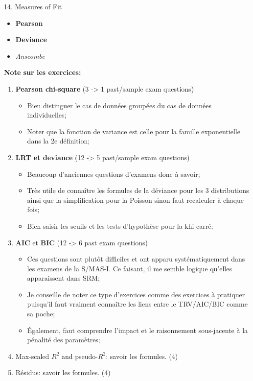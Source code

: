 \documentclass[12pt, titlepage, french]{report}
\begin{document}
\begin{CHPT_SUMM}[label = {GLM-MEZ-FIT}]{14. Measures of Fit}
\begin{enumerate}
\begin{itemize}
\begin{itemize}
		\end{itemize}
		\item	\textbf{Pearson} 
		\item	\textbf{Deviance} 
		\item	\textit{Anscombe} 
	\end{itemize}
\end{enumerate}
\textbf{Note sur les exercices:} 
\begin{enumerate}
	\item	\textbf{Pearson chi-square} (3 -> 1 past/sample exam questions)
	\begin{itemize}
		\item	Bien distinguer le cas de données groupées du cas de données individuelles;
		\item	Noter que la fonction de variance est celle pour la famille exponentielle dans la 2e définition;
	\end{itemize}
	\item	\textbf{LRT et deviance} (12 -> 5 past/sample exam questions)
	\begin{itemize}
		\item	Beaucoup d'anciennes questions d'examens donc à savoir;
		\item	Très utile de connaître les formules de la déviance pour les 3 distributions ainsi que la simplification pour la Poisson sinon faut recalculer à chaque fois;
		\item	Bien saisir les seuils et les tests d'hypothèse pour la khi-carré;
	\end{itemize}
	\item	\textbf{AIC} et \textbf{BIC} (12 -> 6 past exam questions)
	\begin{itemize}
		\item	Ces questions sont plutôt difficiles et ont apparu systématiquement dans les examens de la S/MAS-I. Ce faisant, il me semble logique qu'elles apparaissent dans SRM;
		\item	Je conseille de noter ce type d'exercices comme des exercices à pratiquer puisqu'il faut vraiment connaître les liens entre le TRV/AIC/BIC comme sa poche;
		\item	Également, faut comprendre l'impact et le raisonnement sous-jacente à la pénalité des paramètres;
	\end{itemize}
	\item	Max-scaled $R^{2}$ and pseudo-$R^{2}$: savoir les formules. (4)
	\item	Résidus: savoir les formules. (4)
\end{enumerate}
\end{CHPT_SUMM}
\end{document}
